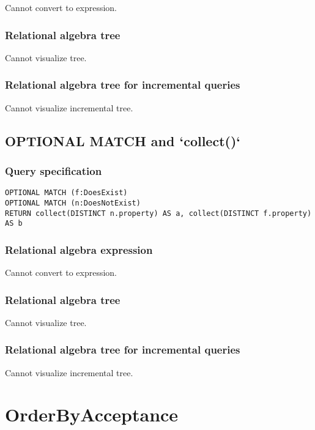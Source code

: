 Cannot convert to expression.

\subsubsection*{Relational algebra tree}

Cannot visualize tree.

\subsubsection*{Relational algebra tree for incremental queries}

Cannot visualize incremental tree.

\subsection{OPTIONAL MATCH and `collect()`}

\subsubsection*{Query specification}

\begin{lstlisting}
OPTIONAL MATCH (f:DoesExist)
OPTIONAL MATCH (n:DoesNotExist)
RETURN collect(DISTINCT n.property) AS a, collect(DISTINCT f.property) AS b
\end{lstlisting}

\subsubsection*{Relational algebra expression}

Cannot convert to expression.

\subsubsection*{Relational algebra tree}

Cannot visualize tree.

\subsubsection*{Relational algebra tree for incremental queries}

Cannot visualize incremental tree.

\section{OrderByAcceptance}

